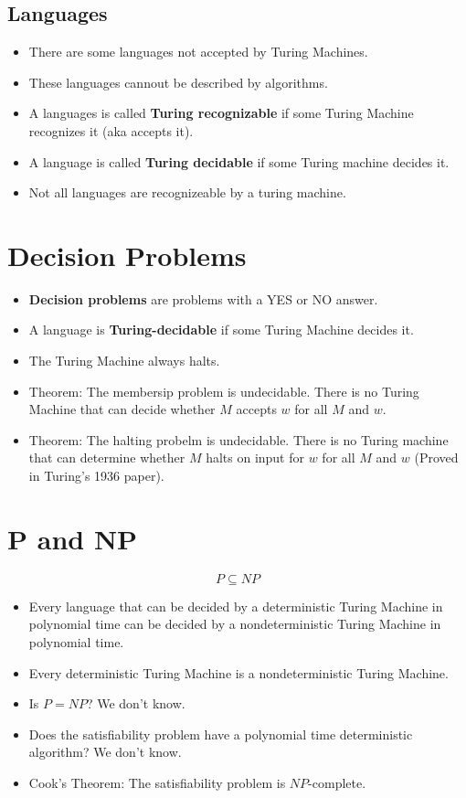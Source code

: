 \documentclass[letter]{article}
\begin{document}
\begin{multicols}{2}
  \subsection{Languages}
  \begin{itemize}
    \item There are some languages not accepted by Turing Machines.
    \item These languages cannout be described by algorithms.
    \item A languages is called \textbf{Turing recognizable} if some Turing
          Machine recognizes it (aka accepts it).
    \item A language is called \textbf{Turing decidable} if some Turing machine
          decides it.
    \item Not all languages are recognizeable by a turing machine.
  \end{itemize}

  \section{Decision Problems}
  \begin{itemize}
    \item \textbf{Decision problems} are problems with a YES or NO answer.
    \item A language is \textbf{Turing-decidable} if some Turing Machine decides
          it.
    \item The Turing Machine always halts.
    \item Theorem: The membersip problem is undecidable. There is no Turing
          Machine that can decide whether $M$ accepts $w$ for all $M$ and $w$.
    \item Theorem: The halting probelm is undecidable. There is no Turing
          machine that can determine whether $M$ halts on input for $w$ for all
          $M$ and $w$ (Proved in Turing's 1936 paper).
  \end{itemize}

  \section{P and NP}
  $$P \subseteq NP$$
  \begin{itemize}
    \item Every language that can be decided by a deterministic Turing
          Machine in polynomial time can be decided by a nondeterministic
          Turing Machine in polynomial time.
    \item Every deterministic Turing Machine is a nondeterministic Turing
          Machine.
    \item Is $P = NP$? We don't know.
    \item Does the satisfiability problem have a polynomial time deterministic
          algorithm? We don't know.
    \item Cook's Theorem: The satisfiability problem is $NP$-complete.
  \end{itemize}

\end{multicols}
\end{document}
